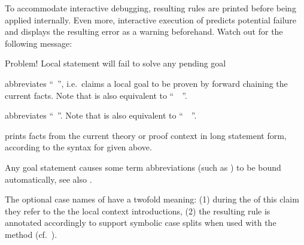 \begin{isabellebody}
\begin{isamarkuptext}
\begin{descr}
  To accommodate interactive debugging, resulting rules are printed
  before being applied internally.  Even more, interactive execution
  of \hyperlink{command.show}{\mbox{}} predicts potential failure and displays the
  resulting error as a warning beforehand.  Watch out for the
  following message:

  \begin{ttbox}
  Problem! Local statement will fail to solve any pending goal
  \end{ttbox}
  
  \item [\hyperlink{command.hence}{\mbox{\isa{\isacommand{hence}}}}] abbreviates ``\hyperlink{command.then}{\mbox{}}~\hyperlink{command.have}{\mbox{}}'', i.e.\ claims a local goal to be proven by forward
  chaining the current facts.  Note that \hyperlink{command.hence}{\mbox{}} is also
  equivalent to ``\hyperlink{command.from}{\mbox{}}~~\hyperlink{command.have}{\mbox{}}''.
  
  \item [\hyperlink{command.thus}{\mbox{\isa{\isacommand{thus}}}}] abbreviates ``\hyperlink{command.then}{\mbox{}}~\hyperlink{command.show}{\mbox{}}''.  Note that \hyperlink{command.thus}{\mbox{}} is also equivalent to
  ``\hyperlink{command.from}{\mbox{}}~~\hyperlink{command.show}{\mbox{}}''.
  
  \item [\hyperlink{command.print-statement}{\mbox{\isa{\isacommand{print{\isacharunderscore}statement}}}}~\isa{a}] prints facts from the
  current theory or proof context in long statement form, according to
  the syntax for \hyperlink{command.lemma}{\mbox{}} given above.

  \end{descr}

  Any goal statement causes some term abbreviations (such as
  \hyperlink{variable.?thesis}{\mbox{}}) to be bound automatically, see also
  .

  The optional case names of \hyperlink{element.obtains}{\mbox{}} have a twofold
  meaning: (1) during the of this claim they refer to the the local
  context introductions, (2) the resulting rule is annotated
  accordingly to support symbolic case splits when used with the
  \hyperlink{method.cases}{\mbox{}} method (cf.\ ).


\end{isamarkuptext}
\end{isabellebody}
